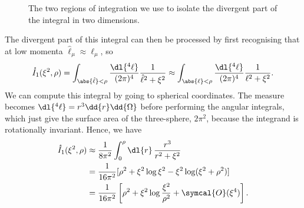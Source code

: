 \documentclass[fleqn]{NotesClass}
\newcommand{\order}{\symcal{O}}
\begin{document}
    \begin{figure}
        \caption{The two regions of integration we use to isolate the divergent part of the integral in two dimensions.}
        \label{fig:isolating singularity}
    \end{figure}
    
    The divergent part of this integral can then be processed by first recognising that at low momenta \(\hat{\ell}_\mu \approx \ell_\mu\), so
    \begin{equation}
        \mathring{I}_1(\xi^2, \rho) = \int_{\abs{\hat{\ell}} < \rho} \frac{\dl{^4\ell}}{(2\pi)^4} \frac{1}{\hat{\ell}^2 + \xi^2} \approx \int_{\abs{\ell} < \rho} \frac{\dl{^4\ell}}{(2\pi)^4} \frac{1}{\ell^2 + \xi^2}.
    \end{equation}
    We can compute this integral by going to spherical coordinates.
    The measure becomes \(\dl{^4\ell} = r^3 \dd{r}\dd{\Omega}\) before performing the angular integrals, which just give the surface area of the three-sphere, \(2\pi^2\), because the integrand is rotationally invariant.
    Hence, we have
    \begin{align}
        \mathring{I}_1(\xi^2, \rho) &\approx \frac{1}{8\pi^2} \int_0^\rho \dl{r} \, \frac{r^3}{r^2 + \xi^2}\\
        &= \frac{1}{16\pi^2} [\rho^2 + \xi^2\log \xi^2 - \xi^2\log(\xi^2 + \rho^2)]\\
        &= \frac{1}{16\pi^2} \left[ \rho^2 + \xi^2\log\frac{\xi^2}{\rho^2} + \order(\xi^4) \right].
    \end{align}
    
\end{document}
